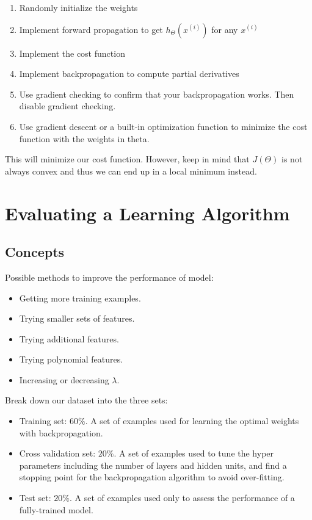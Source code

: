 \documentclass{article}
\begin{document}
\begin{enumerate}
  \item Randomly initialize the weights
  \item Implement forward propagation to get \(h_\Theta(x^{(i)})\) for any \(x^{(i)}\)
  \item Implement the cost function
  \item Implement backpropagation to compute partial derivatives
  \item Use gradient checking to confirm that your backpropagation works. Then disable gradient checking.
  \item Use gradient descent or a built-in optimization function to minimize the cost function with the weights in theta.
\end{enumerate}

\noindent This will minimize our cost function. However, keep in mind that \(J(\Theta)\) is not always convex and thus we can end up in a local minimum instead. 

\section{Evaluating a Learning Algorithm}

\subsection{Concepts}

\noindent Possible methods to improve the performance of model:
\begin{itemize}
\item Getting more training examples.
\item Trying smaller sets of features.
\item Trying additional features.
\item Trying polynomial features.
\item Increasing or decreasing \(\lambda\).
\end{itemize}

\noindent Break down our dataset into the three sets:
\begin{itemize}
\item Training set: \(60\%\). A set of examples used for learning the optimal weights with backpropagation.
\item Cross validation set: \(20\%\). A set of examples used to tune the hyper parameters including the number of layers and hidden units, and find a stopping point for the backpropagation algorithm to avoid over-fitting.
\item Test set: \(20\%\). A set of examples used only to assess the performance of a fully-trained model.
\end{itemize}
\end{document}

